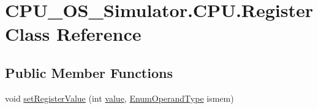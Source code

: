 \hypertarget{class_c_p_u___o_s___simulator_1_1_c_p_u_1_1_register}{}\section{C\+P\+U\+\_\+\+O\+S\+\_\+\+Simulator.\+C\+P\+U.\+Register Class Reference}
\label{class_c_p_u___o_s___simulator_1_1_c_p_u_1_1_register}
\subsection*{Public Member Functions}
\begin{DoxyCompactItemize}
\item 
void \hyperlink{class_c_p_u___o_s___simulator_1_1_c_p_u_1_1_register_ac3fa28aaef5e69623099da101bfb806f}{set\+Register\+Value} (int \hyperlink{class_c_p_u___o_s___simulator_1_1_c_p_u_1_1_register_a2b4f4fe257f216718313f4e1187b72e9}{value}, \hyperlink{namespace_c_p_u___o_s___simulator_1_1_c_p_u_ad49cfe442b74115a326c03b7ae848f76}{Enum\+Operand\+Type} ismem)
\end{DoxyCompactItemize}
